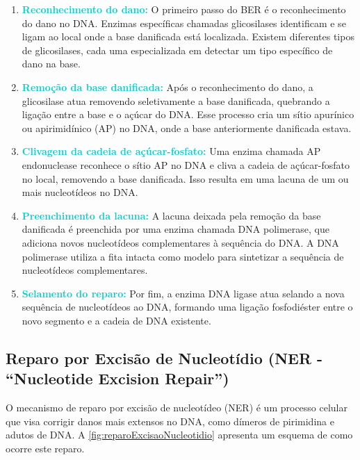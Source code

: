 \documentclass[11pt,a4paper]{article}
\begin{document}
	\begin{enumerate}[label=\textcolor{CarnationPink}{\arabic*${}^\circ $}]
		\item \textcolor{DarkTurquoise}{\textbf{Reconhecimento do dano: }} O primeiro passo do BER é o reconhecimento do dano no DNA. Enzimas específicas chamadas glicosilases identificam e se ligam ao local onde a base danificada está localizada. Existem diferentes tipos de glicosilases, cada uma especializada em detectar um tipo específico de dano na base.
		\item \textcolor{DarkTurquoise}{\textbf{Remoção da base danificada: }} Após o reconhecimento do dano, a glicosilase atua removendo seletivamente a base danificada, quebrando a ligação entre a base e o açúcar do DNA. Esse processo cria um sítio apurínico ou apirimidínico (AP) no DNA, onde a base anteriormente danificada estava.
		\item \textcolor{DarkTurquoise}{\textbf{Clivagem da cadeia de açúcar-fosfato:}} Uma enzima chamada AP endonuclease reconhece o sítio AP no DNA e cliva a cadeia de açúcar-fosfato no local, removendo a base danificada. Isso resulta em uma lacuna de um ou mais nucleotídeos no DNA.
		\item \textcolor{DarkTurquoise}{\textbf{Preenchimento da lacuna:}} A lacuna deixada pela remoção da base danificada é preenchida por uma enzima chamada DNA polimerase, que adiciona novos nucleotídeos complementares à sequência do DNA. A DNA polimerase utiliza a fita intacta como modelo para sintetizar a sequência de nucleotídeos complementares. 
		\item \textcolor{DarkTurquoise}{\textbf{Selamento do reparo:}} Por fim, a enzima DNA ligase atua selando a nova sequência de nucleotídeos ao DNA, formando uma ligação fosfodiéster entre o novo segmento e a cadeia de DNA existente.
	\end{enumerate}

	    
	

\subsection*{Reparo por Excisão de Nucleotídio (NER - ``Nucleotide Excision Repair'')}

	O mecanismo de reparo por excisão de nucleotídeo (NER) é um processo celular que visa corrigir danos mais extensos no DNA, como dímeros de pirimidina e adutos de DNA. A \ref{fig:reparoExcisaoNucleotidio} apresenta um esquema de como ocorre este reparo.
\end{document}
